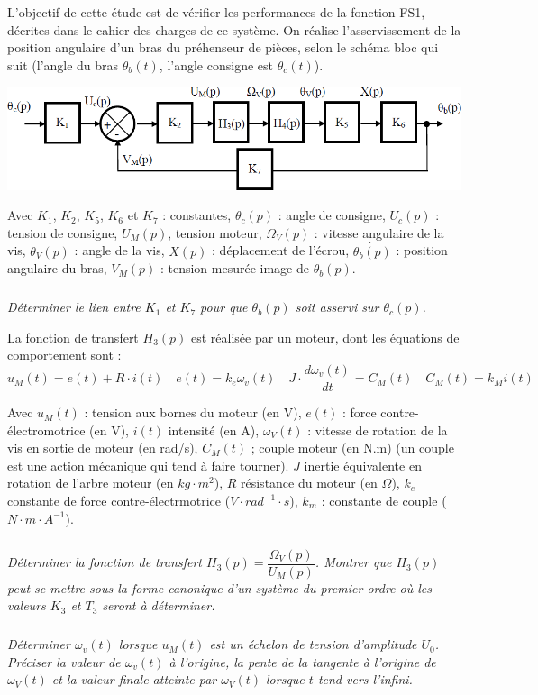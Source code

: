 \documentclass[11pt,oneside]{article}
\begin{document}
L'objectif de cette étude est de vérifier les performances de la fonction FS1, décrites dans le cahier des charges de ce système. On réalise l'asservissement de la position angulaire d'un bras du préhenseur de pièces, selon le schéma bloc qui suit (l'angle du bras $\theta_b(t)$, l'angle consigne est $\theta_c(t)$).

\begin{center}
\includegraphics[width=.9\textwidth]{png/fig_3}
\end{center}

Avec $K_1$, $K_2$, $K_5$, $K_6$ et $K_7$ : constantes, $\theta_c(p)$ : angle de consigne, $U_c(p)$ : tension de consigne, $U_M(p)$, tension moteur, $\Omega_V(p)$ : vitesse angulaire de la vis, $\theta_V(p)$ : angle de la vis, $X(p)$ : déplacement de l'écrou, $\dot{\theta_b(p)}$ : position angulaire du bras, $V_M(p)$ : tension mesurée image de $\theta_b(p)$.

\subparagraph{}
\textit{Déterminer le lien entre $K_1$ et $K_7$ pour que $\theta_b(p)$ soit asservi sur $\theta_c(p)$.}

La fonction de transfert $H_3(p)$ est réalisée par un moteur, dont les équations de comportement sont :
$$
u_M(t)=e(t)+R\cdot i(t) \quad e(t)=k_e\omega_v(t) \quad J\cdot \dfrac{d\omega_v(t)}{dt}=C_M(t) \quad C_M(t)=k_M i(t)
$$

Avec $u_M(t)$ : tension aux bornes du moteur (en V), $e(t)$ : force contre-électromotrice (en V), $i(t)$ intensité (en A), $\omega_V(t)$ : vitesse de rotation de la vis en sortie de moteur (en rad/s), $C_M(t)$ ; couple moteur (en N.m) (un couple est une action mécanique qui tend à faire tourner). $J$ inertie équivalente en rotation de l'arbre moteur (en $kg\cdot m^2$), $R$ résistance du moteur (en $\Omega$), $k_e$ constante de force contre-électrmotrice ($V\cdot rad^{-1}\cdot s$), $k_m$ : constante de couple ($N\cdot m\cdot A^{-1}$).

\subparagraph{}
\textit{Déterminer la fonction de transfert $H_3(p)=\dfrac{\Omega_V(p)}{U_M(p)}$. Montrer que $H_3(p)$ peut se mettre sous la forme canonique d'un système du premier ordre où les valeurs $K_3$ et $T_3$ seront à déterminer.}

\subparagraph{}
\textit{Déterminer $\omega_v(t)$ lorsque $u_M(t)$ est un échelon de tension d'amplitude $U_0$. Préciser la valeur de $\omega_v(t)$ à l'origine, la pente de la tangente à l'origine de $\omega_V(t)$ et la valeur finale atteinte par $\omega_V(t)$ lorsque $t$ tend vers l'infini.}
\end{document}
